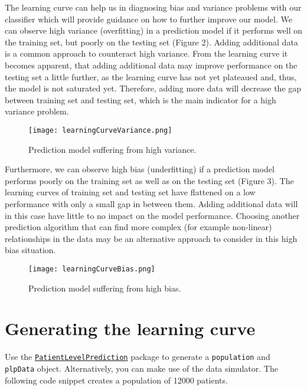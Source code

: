 \documentclass[
]{article}
\begin{document}
The learning curve can help us in diagnosing bias and variance problems
with our classifier which will provide guidance on how to further
improve our model. We can observe high variance (overfitting) in a
prediction model if it performs well on the training set, but poorly on
the testing set (Figure 2). Adding additional data is a common approach
to counteract high variance. From the learning curve it becomes
apparent, that adding additional data may improve performance on the
testing set a little further, as the learning curve has not yet
plateaued and, thus, the model is not saturated yet. Therefore, adding
more data will decrease the gap between training set and testing set,
which is the main indicator for a high variance problem.

\begin{figure}
\centering
\texttt{[image: learningCurveVariance.png]}
\caption{Prediction model suffering from high variance.}
\end{figure}

Furthermore, we can observe high bias (underfitting) if a prediction
model performs poorly on the training set as well as on the testing set
(Figure 3). The learning curves of training set and testing set have
flattened on a low performance with only a small gap in between them.
Adding additional data will in this case have little to no impact on the
model performance. Choosing another prediction algorithm that can find
more complex (for example non-linear) relationships in the data may be
an alternative approach to consider in this high bias situation.

\begin{figure}
\centering
\texttt{[image: learningCurveBias.png]}
\caption{Prediction model suffering from high bias.}
\end{figure}

\hypertarget{generating-the-learning-curve}{%
\section{Generating the learning
curve}\label{generating-the-learning-curve}}

Use the
\href{http://github.com/OHDSI/PatientLevelPrediction}{\texttt{PatientLevelPrediction}}
package to generate a \texttt{population} and \texttt{plpData} object.
Alternatively, you can make use of the data simulator. The following
code snippet creates a population of 12000 patients.
\end{document}
